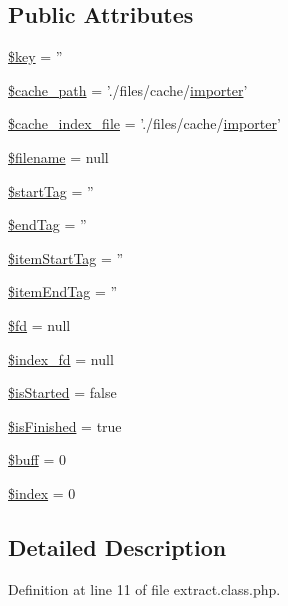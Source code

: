 \subsection*{Public Attributes}
\begin{DoxyCompactItemize}
\item 
\hyperlink{classextract_a894aac7e47b9ed0773922aa7eb9ce578}{\$key} = ''
\item 
\hyperlink{classextract_a00f1309c1e975d137a9f17ad9afc5d1e}{\$cache\-\_\-path} = './files/cache/\hyperlink{classimporter}{importer}'
\item 
\hyperlink{classextract_a6bd40f89eeb4e608723a39f5824d0c1e}{\$cache\-\_\-index\-\_\-file} = './files/cache/\hyperlink{classimporter}{importer}'
\item 
\hyperlink{classextract_abec232df6889e57dd327ddf132799f4c}{\$filename} = null
\item 
\hyperlink{classextract_a3acbe3af3d1b083b33023202a5e05432}{\$start\-Tag} = ''
\item 
\hyperlink{classextract_a46190b1f23addca9726e18aa15929c2a}{\$end\-Tag} = ''
\item 
\hyperlink{classextract_a11629128aedd1fc4b0a889640c693d0a}{\$item\-Start\-Tag} = ''
\item 
\hyperlink{classextract_abddb079afc9c7c2f210e7793b93388e5}{\$item\-End\-Tag} = ''
\item 
\hyperlink{classextract_ae21a224916b245a23dd69139f58c81ed}{\$fd} = null
\item 
\hyperlink{classextract_a6805ee81f498cae226d90b8fa9ecba88}{\$index\-\_\-fd} = null
\item 
\hyperlink{classextract_a609fc88642ae3bf1e27f0232f1b21171}{\$is\-Started} = false
\item 
\hyperlink{classextract_a0962c888279f7c5d551d3fdf1af1ee4c}{\$is\-Finished} = true
\item 
\hyperlink{classextract_a6f9b9ca9e370fe234587851838a368e7}{\$buff} = 0
\item 
\hyperlink{classextract_a167ca671b16d1b95eef76886f6d91a0c}{\$index} = 0
\end{DoxyCompactItemize}


\subsection{Detailed Description}


Definition at line 11 of file extract.\-class.\-php.



